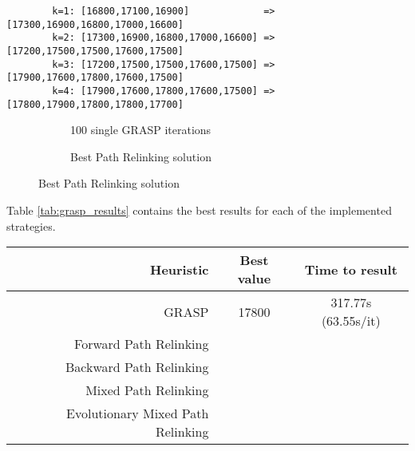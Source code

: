 \begin{footnotesize}
	\begin{verbatim}
		k=1: [16800,17100,16900]             => [17300,16900,16800,17000,16600]
		k=2: [17300,16900,16800,17000,16600] => [17200,17500,17500,17600,17500]
		k=3: [17200,17500,17500,17600,17500] => [17900,17600,17800,17600,17500]
		k=4: [17900,17600,17800,17600,17500] => [17800,17900,17800,17800,17700]
	\end{verbatim}
\end{footnotesize}

\begin{figure}[H]
	\centering
	\begin{subfigure}{.7\textwidth}
		\centering
		\caption{100 single GRASP iterations}
		\label{fig:grasp_100}
	\end{subfigure}
	\begin{subfigure}{.7\textwidth}
		\centering
		\caption{Best Path Relinking solution}
		\label{fig:pr_18500}
	\end{subfigure}
\end{figure}

\vspace{20px}

Table \ref{tab:grasp_results} contains the best results for each of the implemented strategies.

\begin{center}
	\begin{tabular}{r|c|c}
		Heuristic							& Best value	& Time to result 		\\
		\hline
		GRASP 								& 17800			& 317.77s (63.55s/it) 	\\
		Forward Path Relinking				&  		&  						\\
		Backward Path Relinking				& 			&  						\\
		Mixed Path Relinking 				&  			& 						\\
		Evolutionary Mixed Path Relinking	& 			& 						\\
	\end{tabular}
\end{center}
